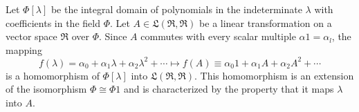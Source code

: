 Let $\Phi[\lambda]$ be the integral domain of polynomials in the indeterminate $\lambda$ with coefficients in the field $\Phi$. Let $A \in \mathfrak{L}(\mathfrak{R}, \mathfrak{R})$ be a linear transformation on a vector space $\mathfrak{R}$ over $\Phi$. Since $A$ commutes with every scalar multiple $\alpha 1 = \alpha_l$, the mapping
$$f(\lambda) = \alpha_0 + \alpha_1 \lambda + \alpha_2 \lambda^2 + \cdots \mapsto f(A) \equiv \alpha_0 1 + \alpha_1 A + \alpha_2 A^2 + \cdots$$
is a homomorphism of $\Phi[\lambda]$ into $\mathfrak{L}(\mathfrak{R}, \mathfrak{R})$. This homomorphism is an extension of the isomorphism $\Phi \cong \Phi 1$ and is characterized by the property that it maps $\lambda$ into $A$.
